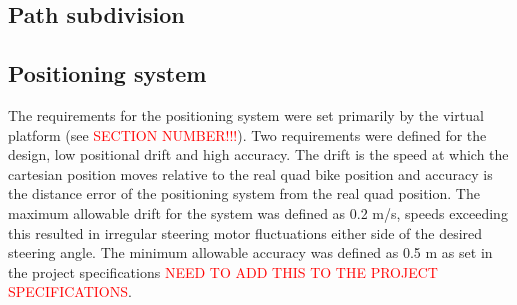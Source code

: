 \documentclass[main.tex]{subfiles}
\begin{document}
\subsection{Path subdivision}

\subsection{Positioning system}
The requirements for the positioning system were set primarily by the virtual platform (see \textcolor{red}{SECTION NUMBER!!!}). Two requirements were defined for the design, low positional drift and high accuracy. The drift is the speed at which the cartesian position moves relative to the real quad bike position and accuracy is the distance error of the positioning system from the real quad position. The maximum allowable drift for the system was defined as 0.2 m/s, speeds exceeding this resulted in irregular steering motor fluctuations either side of the desired steering angle. The minimum allowable accuracy was defined as 0.5 m as set in the project specifications \textcolor{red}{NEED TO ADD THIS TO THE PROJECT SPECIFICATIONS}.
\end{document}
